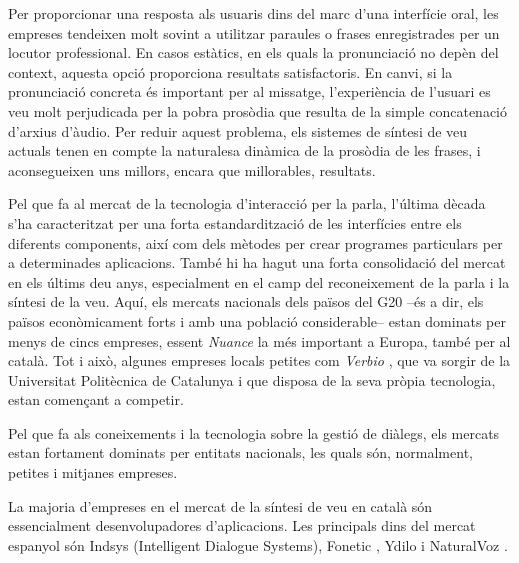 \begin{multicols}{2}

Per proporcionar una resposta als usuaris dins del marc d’una interfície oral, les empreses tendeixen molt sovint a utilitzar paraules o frases enregistrades per un locutor professional. En casos estàtics, en els quals la pronunciació no depèn del context, aquesta opció proporciona resultats satisfactoris. En canvi, si la pronunciació concreta és important per al missatge, l’experiència de l’usuari es veu molt perjudicada per la pobra prosòdia que resulta de la simple concatenació d’arxius d’àudio. Per reduir aquest problema, els sistemes de síntesi de veu actuals tenen en compte la naturalesa dinàmica de la prosòdia de les frases, i aconsegueixen uns millors, encara que millorables, resultats. 

Pel que fa al mercat de la tecnologia d’interacció per la parla, l’última dècada s’ha caracteritzat per una forta estandardització de les interfícies entre els diferents components, així com dels mètodes per crear programes particulars per a determinades aplicacions. També hi ha hagut una forta consolidació del mercat en els últims deu anys, especialment en el camp del reconeixement de la parla i la síntesi de la veu. Aquí, els mercats nacionals dels països del G20 –és a dir, els països econòmicament forts i amb una població considerable– estan dominats per menys de cincs empreses, essent \textit{Nuance} la més important a Europa, també per al català. Tot i això, algunes empreses locals petites com \textit{Verbio} \cite{CAT-Nota25}, que va sorgir de la Universitat Politècnica de Catalunya i que disposa de la seva pròpia tecnologia, estan començant a competir.

Pel que fa als coneixements i la tecnologia sobre la gestió de diàlegs, els mercats estan fortament dominats per entitats nacionals, les quals són, normalment, petites i mitjanes empreses. 

La majoria d’empreses en el mercat de la síntesi de veu en català són essencialment desenvolupadores d’aplicacions. Les principals dins del mercat espanyol són Indsys \cite{CAT-Nota26} (Intelligent Dialogue Systems), Fonetic \cite{CAT-Nota27}, Ydilo \cite{CAT-Nota28} i NaturalVoz \cite{CAT-Nota29}.


\end{multicols}
